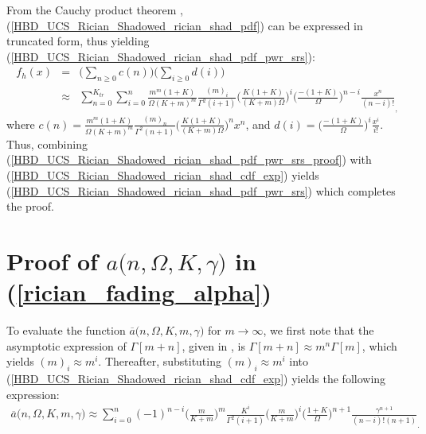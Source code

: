 From the Cauchy product theorem \cite{andras2011generalized,amann2005analysis}, (\ref{HBD_UCS_Rician_Shadowed_rician_shad_pdf}) can be expressed in truncated form, thus yielding (\ref{HBD_UCS_Rician_Shadowed_rician_shad_pdf_pwr_srs}):
\begin{eqnarray} \label{HBD_UCS_Rician_Shadowed_rician_shad_pdf_pwr_srs_proof}
f_h(x) & = & \bigg(\sum_{n\geq0}c(n)\bigg) \bigg(\sum_{i\geq0}d(i)\bigg) \nonumber\\
	& \approx & \sum_{n=0}^{K_{tr}} \sum_{i=0}^{n} \frac{m^m(1+K)}{\Omega(K+m)^m} \frac{(m)_i}{\Gamma^2(i+1)} \bigg(\frac{K(1+K)}{(K+m)\Omega}\bigg)^{i} \bigg(\frac{-(1+K)}{\Omega}\bigg)^{n-i} \frac{x^n}{(n-i)!}_,
\end{eqnarray}
where $c(n) = \frac{m^m(1+K)}{\Omega(K+m)^m} \frac{(m)_n}{\Gamma^2(n+1)} \Big(\frac{K(1+K)}{(K+m)\Omega}\Big)^n x^n$, and $d(i) = \Big(\frac{-(1+K)}{\Omega}\Big)^i \frac{x^i}{i!}$. Thus, combining (\ref{HBD_UCS_Rician_Shadowed_rician_shad_pdf_pwr_srs_proof}) with (\ref{HBD_UCS_Rician_Shadowed_rician_shad_cdf_exp}) yields (\ref{HBD_UCS_Rician_Shadowed_rician_shad_pdf_pwr_srs}) which completes the proof.

\section{Proof of $\widehat{a}\big(n,\Omega,K,\gamma\big)$ in (\ref{rician_fading_alpha})} \label{HBD_UCS_Rician_Shadowed_rician_fading_alpha_corollary_proof}
To evaluate the function $\overline{a}\big(n,\Omega,K,m,\gamma\big)$ for $m \to \infty$, we first note that the asymptotic expression of $\Gamma[m+n]$, given in \cite[eq. (25)]{rached2017unified}, is $\Gamma[m+n] \approx m^n\Gamma[m]$, which yields $(m)_i \approx m^i$. Thereafter, substituting $(m)_i \approx m^i$ into (\ref{HBD_UCS_Rician_Shadowed_rician_shad_cdf_exp}) yields the following expression:
\begin{eqnarray} \label{HBD_UCS_Rician_Shadowed_rician_shad_cdf_exp2}
\overline{a}\big(n,\Omega,K,m,\gamma\big) \approx \sum_{i=0}^n (-1)^{n-i} \bigg(\frac{m}{K+m}\bigg)^{m} \frac{K^i}{\Gamma^2(i+1)} \bigg(\frac{m}{K+m}\bigg)^{i} \bigg(\frac{1+K}{\Omega}\bigg)^{n+1} \frac{\gamma^{n+1}}{(n-i)!(n+1)}_.
\end{eqnarray}

